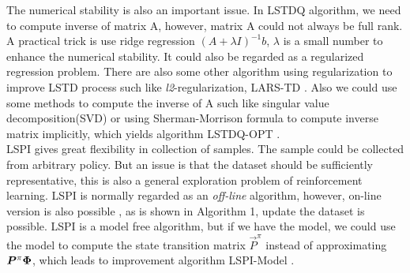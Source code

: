 The numerical stability is also an important issue. In LSTDQ algorithm, we need to compute inverse of matrix A, however, matrix A could not always be full rank. A practical trick is use ridge regression $(A + \lambda I)^{-1} b$, $\lambda$ is a small number to enhance the numerical stability. It could also be regarded as a regularized regression problem. There are also some other algorithm using regularization to improve LSTD process such like \textit{l2}-regularization, LARS-TD \cite{kolter2009regularization}\cite{petrik2010feature}. Also we could use some methods to compute the inverse of A such like singular value decomposition(SVD) or using Sherman-Morrison formula to compute inverse matrix implicitly, which yields algorithm LSTDQ-OPT \cite{lagoudakis2003least}.
\\
LSPI gives  great flexibility in collection of samples. The sample could be collected from arbitrary policy. But an issue is that the dataset should be sufficiently representative, this is also a general exploration problem of reinforcement learning. LSPI is normally regarded as an \textit{off-line} algorithm, however, on-line version is also possible \cite{li2009online}\cite{ma2010convergence}, as is shown in Algorithm 1, update the dataset is possible. LSPI is a model free algorithm, but if we have the model, we could use the model to compute the state transition matrix $\vec P^\pi$ instead of approximating $\vec P^\pi \vecPhi$, which leads to  improvement algorithm LSPI-Model \cite{lagoudakis2003least}. \\

